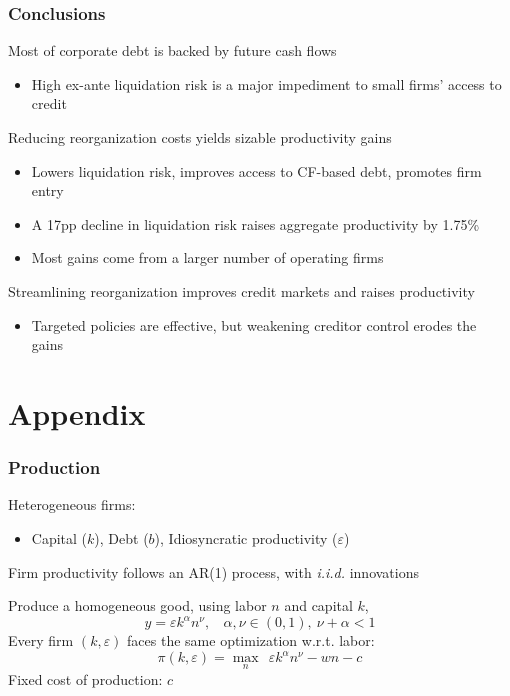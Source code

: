 \documentclass[aspectratio=169,xcolor=table]{beamer}
\begin{document}
\begin{frame}[label=3] \frametitle{Conclusions}

Most of corporate debt is backed by future cash flows
\begin{itemize} \small
    \item High ex-ante liquidation risk is a major impediment to small firms' access to credit
\end{itemize} \normalsize \vspace{3mm}


Reducing reorganization costs yields sizable productivity gains
\begin{itemize} \small
     \item Lowers liquidation risk, improves access to CF-based debt, promotes firm entry 
     \item A 17pp decline in liquidation risk raises aggregate productivity by 1.75\%
     \item Most gains come from a larger number of operating firms
\end{itemize} \normalsize \vspace{3mm}

Streamlining reorganization improves credit markets and raises productivity
\begin{itemize} \small
     \item Targeted policies are effective, but weakening creditor control erodes the gains
\end{itemize} \normalsize

\end{frame}


\appendix
\section{Appendix}


\begin{frame}[label=Firms] \frametitle{Production}

Heterogeneous firms: 
\begin{itemize} \small
    \item Capital ($k$), Debt ($b$), Idiosyncratic productivity ($\varepsilon$)
\end{itemize} 
Firm productivity follows an AR(1) process, with \textit{i.i.d.} innovations \normalsize \vspace{3mm}

Produce a homogeneous good, using labor $n$ and capital $k$,
$$ y = \varepsilon k^{\alpha}n^{\nu}, \ \ \ \ \alpha,\nu \in (0,1),  \ \nu + \alpha < 1 $$
Every firm $(k,\varepsilon)$ faces the same optimization w.r.t. labor:
$$ \pi(k,\varepsilon) = \max_{n} \ \  \varepsilon k^{\alpha}n^{\nu} - wn - c$$ 
Fixed cost of production: $c$

\end{frame}
\end{document}
